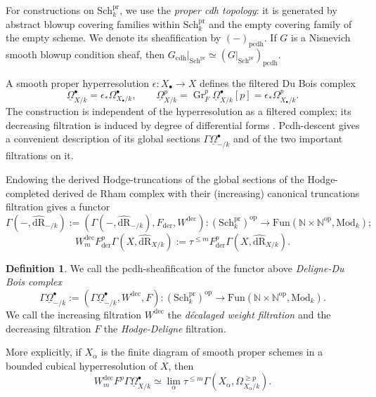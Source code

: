 \documentclass{amsart}
\theoremstyle{plain}
\theoremstyle{definition}
\newtheorem{defi}[prop]{Definition}
\newcommand{\lra}{\longrightarrow}
\newcommand{\bbN}{\mathbb{N}}
\newcommand{\Mod}{\mathrm{Mod}}
\newcommand{\Sch}{\mathrm{Sch}}
\newcommand{\Fun}{\mathrm{Fun}}
\DeclareMathOperator{\Gr}{Gr}
\newcommand{\der}{\mathrm{der}}
\newcommand{\cdh}{\mathrm{cdh}}
\newcommand{\pcdh}{\mathrm{pcdh}}
\newcommand{\dR}{\mathrm{dR}}
\begin{document}
For constructions on $\Sch^{\mathrm{pr}}_k$, we use the
\emph{proper cdh topology}: it is generated by abstract blowup covering families within
$\Sch^{\mathrm{pr}}_k$ and the empty covering family of the empty scheme. We denote its sheafification by
$(-)_{\pcdh}$. If $G$ is a Nisnevich smooth blowup condition sheaf, then $G_{\cdh}|_{\Sch^{\mathrm{pr}}}\simeq (G|_{\Sch^{\mathrm{pr}}})_{\pcdh}$.

\medskip

A smooth proper hyperresolution $\epsilon:X_\bullet\to X$ defines the filtered Du Bois complex
\[
\underline\Omega^\bullet_{X/k}
 =\epsilon_*\Omega^\bullet_{X_\bullet/k},\qquad
\underline\Omega^p_{X/k}
 =\Gr_F^p\underline\Omega^\bullet_{X/k}[p]
 =\epsilon_*\Omega^p_{X_\bullet/k}.
\]
The construction is independent of the hyperresolution as a filtered complex; its decreasing filtration is induced by degree of differential forms \cite{DB81,CHW08,Bha12}.
Pcdh-descent gives a convenient description of its global sections $\Gamma\underline\Omega^\bullet_{-/k}$ and of the two important filtrations on it.

Endowing the derived Hodge-truncations of the global sections of the Hodge-completed derived de Rham complex with their (increasing) canonical truncations filtration gives a functor
\[
\Gamma(-, \widehat{\dR}_{-/k}):=(\Gamma(-, \widehat{\dR}_{-/k}), F_{\der}, W^{\mathrm{dec}}): (\Sch^{\mathrm{pr}}_k)^{\mathrm{op}} \lra \Fun(\bbN\times\bbN^{\mathrm{op}}, \Mod_k); \]\[ W^{\mathrm{dec}}_mF_{\der}^p\Gamma(X, \widehat{\dR}_{X/k}):=\tau^{\le m}F_{\der}^p\Gamma(X, \widehat{\dR}_{X/k}).
\]

\begin{defi}\label{DBcomplex}
    We call the pcdh-sheafification of the functor above \emph{Deligne-Du Bois complex}
    \[
    \Gamma\underline\Omega^\bullet_{-/k}:=(\Gamma\underline\Omega^\bullet_{-/k}, W^{\mathrm{dec}}, F): (\Sch^{\mathrm{pr}}_k)^{\mathrm{op}} \lra \Fun(\bbN\times\bbN^{\mathrm{op}}, \Mod_k).
    \]
    We call the increasing filtration $W^{\mathrm{dec}}$ the \emph{d\'ecalaged weight filtration} and the decreasing filtration $F$ the \emph{Hodge-Deligne} filtration.
\end{defi}

More explicitly, if $X_\alpha$ is the finite diagram of smooth proper schemes in a bounded cubical hyperresolution of $X$, then
\begin{equation}\label{eqDBbifilteredhyperresolution}
W^{\mathrm{dec}}_mF^p\Gamma\underline\Omega^\bullet_{X/k}
 \simeq
 \operatorname*{lim}_{\alpha}
 \tau^{\le m}\Gamma
       (X_\alpha,\Omega^{\geq p}_{X_\alpha/k}).
\end{equation}
\end{document}
